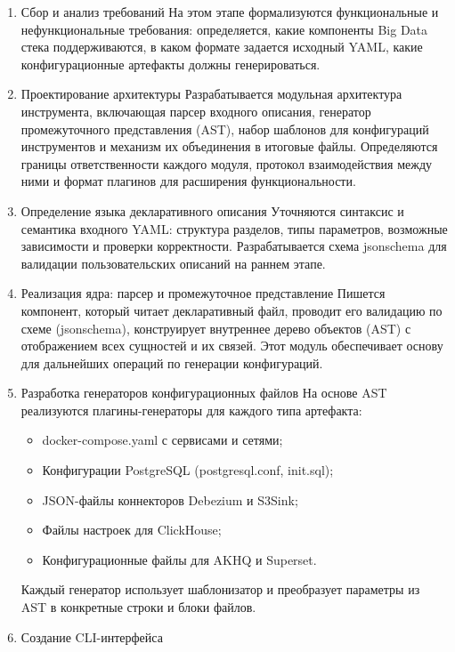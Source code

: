 \begin{enumerate}[label=\textbf{Этап \arabic*.}]
      \item Сбор и анализ требований
            На этом этапе формализуются функциональные и нефункциональные требования: определяется, какие компоненты Big Data стека поддерживаются, в каком формате задается исходный YAML, какие конфигурационные артефакты должны генерироваться.
      \item  Проектирование архитектуры
            Разрабатывается модульная архитектура инструмента, включающая парсер входного описания, генератор промежуточного представления (AST), набор шаблонов для конфигураций инструментов и механизм их объединения в итоговые файлы. Определяются границы ответственности каждого модуля, протокол взаимодействия между ними и формат плагинов для расширения функциональности.
      \item  Определение языка декларативного описания
            Уточняются синтаксис и семантика входного YAML: структура разделов, типы параметров, возможные зависимости и проверки корректности. Разрабатывается схема jsonschema для валидации пользовательских описаний на раннем этапе.
      \item  Реализация ядра: парсер и промежуточное представление
            Пишется компонент, который читает декларативный файл, проводит его валидацию по схеме (jsonschema), конструирует внутреннее дерево объектов (AST) с отображением всех сущностей и их связей. Этот модуль обеспечивает основу для дальнейших операций по генерации конфигураций.
      \item Разработка генераторов конфигурационных файлов
            На основе AST реализуются плагины-генераторы для каждого типа артефакта:
            \begin{itemize}
                  \item docker-compose.yaml с сервисами и сетями;
                  \item Конфигурации PostgreSQL (postgresql.conf, init.sql);
                  \item JSON-файлы коннекторов Debezium и S3Sink;
                  \item Файлы настроек для ClickHouse;
                  \item Конфигурационные файлы для AKHQ и Superset.
            \end{itemize}
            Каждый генератор использует шаблонизатор и преобразует параметры из AST в конкретные строки и блоки файлов.
      \item Создание CLI-интерфейса

\end{enumerate}
